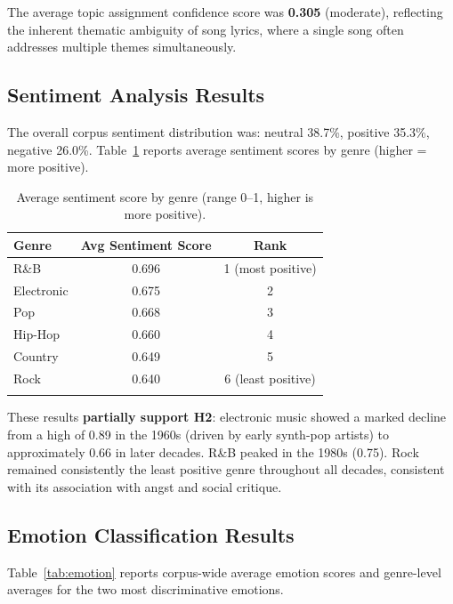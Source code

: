 \documentclass[pdflatex,sn-mathphys-num]{sn-jnl}
\begin{document}
The average topic assignment confidence score was \textbf{0.305} (moderate), reflecting the inherent thematic ambiguity of song lyrics, where a single song often addresses multiple themes simultaneously.

\subsection{Sentiment Analysis Results}\label{subsec9}

The overall corpus sentiment distribution was: neutral 38.7\%, positive 35.3\%, negative 26.0\%. Table~\ref{tab:sentiment} reports average sentiment scores by genre (higher = more positive).

\begin{table}[h]
\caption{Average sentiment score by genre (range 0--1, higher is more positive).}\label{tab:sentiment}
\begin{tabular}{@{}lcc@{}}
\toprule
\textbf{Genre} & \textbf{Avg Sentiment Score} & \textbf{Rank} \\
\midrule
R\&B       & 0.696 & 1 (most positive) \\
Electronic & 0.675 & 2 \\
Pop        & 0.668 & 3 \\
Hip-Hop    & 0.660 & 4 \\
Country    & 0.649 & 5 \\
Rock       & 0.640 & 6 (least positive) \\
\botrule
\end{tabular}
\end{table}

These results \textbf{partially support H2}: electronic music showed a marked decline from a high of 0.89 in the 1960s (driven by early synth-pop artists) to approximately 0.66 in later decades. R\&B peaked in the 1980s (0.75). Rock remained consistently the least positive genre throughout all decades, consistent with its association with angst and social critique.

\subsection{Emotion Classification Results}\label{subsec10}

Table~\ref{tab:emotion} reports corpus-wide average emotion scores and genre-level averages for the two most discriminative emotions.
\end{document}
